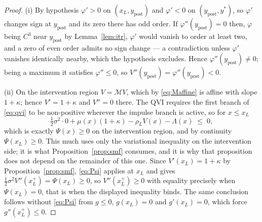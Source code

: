 \documentclass[11pt]{article}
\theoremstyle{remark}
\begin{document}
\begin{proof}
(i) By hypothesis $\varphi' > 0$ on $(x_L,y_{\mathrm{post}})$ and
$\varphi'<0$ on $(y_{\mathrm{post}},y^*)$, so $\varphi'$ changes sign at
$y_{\mathrm{post}}$ and its zero there has odd order. If
$\varphi''(y_{\mathrm{post}})=0$ then, $\varphi$ being $C^3$ near
$y_{\mathrm{post}}$ by Lemma~\ref{lem:itr}, $\varphi'$ would vanish to
order at least two, and a zero of even order admits no sign change --- a
contradiction unless $\varphi'$ vanishes identically nearby, which the
hypothesis excludes. Hence $\varphi''(y_{\mathrm{post}}) \ne 0$; being a
maximum it satisfies $\varphi'' \le 0$, so
$V''(y_{\mathrm{post}}) = \varphi''(y_{\mathrm{post}}) < 0$.

(ii) On the intervention region $V = \mathcal{M}V$, which by
\eqref{eq:Maffine} is affine with slope $1+\kappa$; hence $V'=1+\kappa$
and $V''=0$ there. The QVI requires the first branch of \eqref{eq:qvi} to
be non-positive wherever the impulse branch is active, so for $x \le x_L$
\[
\tfrac12\sigma^2\cdot 0 + \mu(x)(1+\kappa) - \rho_L V(x) - \Lambda(x)
\;\le\; 0,
\]
which is exactly $\Psi(x) \ge 0$ on the intervention region, and by
continuity $\Psi(x_L)\ge0$. This much uses only the variational
inequality on the intervention side; it is what
Proposition~\ref{prop:smf} consumes, and it is why that proposition does
not depend on the remainder of this one. Since $V'(x_L)=1+\kappa$ by
Proposition~\ref{prop:smf},
\eqref{eq:Psi} applies at $x_L$ and gives
$\tfrac12\sigma^2 V''(x_L^+) = \Psi(x_L) \ge 0$, so $V''(x_L^+)\ge0$ with
equality precisely when $\Psi(x_L)=0$, that is when the displayed
inequality binds. The same conclusion follows without \eqref{eq:Psi} from
$g\le0$, $g(x_L)=0$ and $g'(x_L)=0$, which force $g''(x_L^+)\le0$.
\end{proof}
\end{document}
